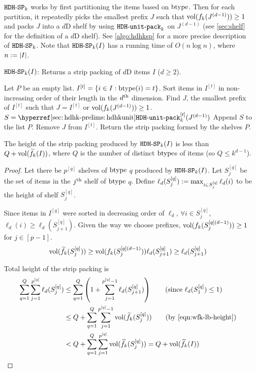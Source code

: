 $\operatorname{\mathtt{HDH-SP}}_{k}$ works by first partitioning the items based on $\operatorname{btype}$.
Then for each partition, it repeatedly picks the smallest prefix $J$
such that $\operatorname{vol}(f_k(J^{(d-1)})) \ge 1$ and packs $J$ into a $d$D shelf
by using $\operatorname{\mathtt{HDH-unit-pack}}_k$ on $J^{(d-1)}$
(see \cref{sec:shelf} for the definition of a $d$D shelf).
See \cref{algo:hdhksp} for a more precise description of $\operatorname{\mathtt{HDH-SP}}_{k}$.
Note that $\operatorname{\mathtt{HDH-SP}}_{k}(I)$ has a running time of $O(n\log n)$, where $n := |I|$.

\begin{algorithm}[!ht]
\caption{$\operatorname{\mathtt{HDH-SP}}_{k}(I)$:
Returns a strip packing of $d$D items $I$ ($d \ge 2$).}
\label{algo:hdhksp}
\begin{algorithmic}[1]
\State Let $P$ be an empty list.
    \State $I^{[t]} = \{i \in I: \operatorname{btype}(i) = t\}$.
    \State Sort items in $I^{[t]}$ in non-increasing order of their length in the $d^{\textrm{th}}$ dimension.
        \State Find $J$, the smallest prefix of $I^{[t]}$ such that
            $J = I^{[t]}$ or $\operatorname{vol}(f_k(J^{(d-1)})) \ge 1$.
        \State $S = \hdhkunitHyp^{[t]}(J^{(d-1)})$
        \State Append $S$ to the list $P$.
        \State Remove $J$ from $I^{[t]}$.
    \EndWhile
\EndFor
\State Return the strip packing formed by the shelves $P$.
\end{algorithmic}
\end{algorithm}

\begin{theorem}
\label{thm:hdhk-fvol}
The height of the strip packing produced by $\operatorname{\mathtt{HDH-SP}}_{k}(I)$ is less than $Q + \operatorname{vol}(\widetilde{f}_{k}(I))$,
where $Q$ is the number of distinct $\operatorname{btype}$s of items (so $Q \le k^{d-1}$).
\end{theorem}
\begin{proof}
Let there be $p^{[q]}$ shelves of $\operatorname{btype}$ $q$ produced by $\operatorname{\mathtt{HDH-SP}}_{k}(I)$.
Let $S_j^{[q]}$ be the set of items in the $j^{\textrm{th}}$ shelf of $\operatorname{btype}$ $q$.
Define $\ell_d(S_j^{[q]}) := \max_{i \in S_j^{[q]}} \ell_d(i)$
to be the height of shelf $S_j^{[q]}$.

Since items in $I^{[q]}$ were sorted in decreasing order of $\ell_d$,
$\forall i \in S_j^{[q]}$, $\ell_d(i) \ge \ell_d(S_{j+1}^{[q]})$.
Given the way we choose prefixes, $\operatorname{vol}(f_k(S_j^{[q] (d-1)})) \ge 1$ for $j \in [p-1]$.
\begin{equation}
\label{eqn:wfk-lb-height}
\operatorname{vol}(\widetilde{f}_{k}(S_j^{[q]}))
\ge \operatorname{vol}(f_k(S_j^{[q] (d-1)}))\ell_d(S_{j+1}^{[q]})
\ge \ell_d(S_{j+1}^{[q]})
\end{equation}

Total height of the strip packing is
\begin{align*}
\sum_{q=1}^Q \sum_{j=1}^{p^{[q]}} \ell_d(S_j^{[q]})
&\le \sum_{q=1}^Q \left(1 + \sum_{j=1}^{p^{[q]}-1} \ell_d(S_{j+1}^{[q]})\right)
\tag{since $\ell_d(S_1^{[q]}) \le 1$}
\\ &\le Q + \sum_{q=1}^Q \sum_{j=1}^{p^{[q]}-1} \vol(\wfk(S_j^{[q]}))
\tag{by \eqref{eqn:wfk-lb-height}}
\\ &< Q + \sum_{q=1}^Q \sum_{j=1}^{p^{[q]}} \vol(\wfk(S_j^{[q]}))
= Q + \vol(\wfk(I))
\qedhere \end{align*}
\end{proof}

